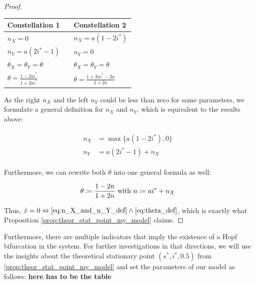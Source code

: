 \documentclass[12pt,a4paper,twoside]{article}
\begin{document}
\begin{proof}
	\begin{table}[h!]
	\centering
		\begin{tabular}{lll}
			Constellation 1 & & Constellation 2\\
			\hline
			$n_X = 0$ && $n_X = a(1-2i^*)$\\
			$n_Y = a(2i^*-1)$ && $n_Y = 0$ \\
			$\theta_X = \theta_Y = \theta$ && $\theta_X = \theta_Y = \theta$\\
			$\theta = \frac{1-2ai^*}{1+2ai^*}$ && $\theta = \frac{1+2ai^*-2a}{1+2a}$\\
		\end{tabular}
	\end{table}
	
	As the right $n_X$ and the left $n_Y$ could be less than zero for some parameters, we formulate a general definition for $n_X$ and $n_Y$, which is equivalent to the results above:
	
	\begin{align}\label{eq:n_X_and_n_Y_def}
	\begin{split}
		n_X &= \max \lbrace a\left(1-2i^*\right), 0\rbrace\\
		n_Y & = a\left(2i^* - 1\right) + n_X
		\end{split}
	\end{align}
	
	Furthermore, we can rewrite both $\theta$ into one general formula as well:
	
	\begin{equation}\label{eq:theta_def}
		\theta \coloneqq \frac{1-2n}{1+2n} \textnormal{ with }n \coloneqq ai^* + n_X
	\end{equation}
	
	Thus, $\dot{x} = 0 \Leftrightarrow \eqref{eq:n_X_and_n_Y_def} \land \eqref{eq:theta_def}$, which is exactly what Proposition \ref{prop:theor_stat_point_my_model} claims.
\end{proof}

Furthermore, there are multiple indicators that imply the existence of a Hopf bifurcation in the system. For further investigations in that directions, we will use the insights about the theoretical stationary point $\left(s^*, i^*, 0.5\right)$ from \eqref{prop:theor_stat_point_my_model} and set the parameters of our model as follows: \textbf{here has to be the table}%
\end{document}
